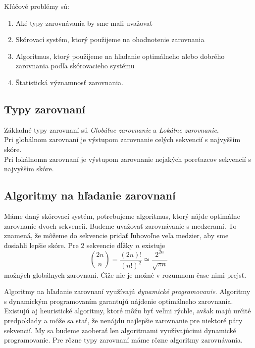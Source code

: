 Kľúčové problémy sú:
\begin{enumerate}
\item Aké typy zarovnávania by sme mali uvažovať
\item Skórovací systém, ktorý použijeme na ohodnotenie zarovnania
\item Algoritmus, ktorý použijeme na hľadanie optimálneho alebo dobrého zarovnania podľa skórovacieho systému
\item Štatistická významnosť zarovnania.
\end{enumerate}

\subsection{Typy zarovnaní}
Základné typy zarovnaní sú \textit{Globálne zarovnanie} a \textit{Lokálne zarovnanie}.\\ 
Pri globálnom zarovnaní je výstupom zarovnanie celých sekvencií s najvyšším skóre.\\
Pri lokálnomn zarovnaní je výstupom zarovnanie nejakých poreťazcov sekvencií s najvyšším skóre.


\subsection{Algoritmy na hľadanie zarovnaní}
Máme daný skórovací systém, potrebujeme algoritmus, ktorý nájde optimálne zarovnanie dvoch sekvencií.
Budeme uvažovať zarovnávanie s medzerami. To znamená, že môžeme do sekvencie pridať ľubovoľne veľa medzier, aby sme dosiahli lepšie skóre. Pre 2 sekvencie dĺžky $n$ existuje 
$$ {2n \choose n}  = \frac{(2n)!}{(n!)^2} \simeq \frac{2^{2n}}{\sqrt{\pi n}} $$
možných globálnych zarovnaní. Čiže nie je možné v rozumnom čase nimi prejsť.

Algoritmy na hľadanie zarovnaní využívajú \textit{dynamické programovanie}. Algoritmy s dynamickým programovaním garantujú nájdenie optimálneho zarovnania.
Existujú aj heuristické algoritmy, ktoré môžu byť veľmi rýchle, avšak majú určité predpoklady a môže sa stať, že nenájdu najlepšie zarovnanie pre niektoré páry sekvencií.
My sa budeme zaoberať len algoritmami využívajúcimi dynamické programovanie. Pre rôzne typy zarovnaní máme rôzne algoritmy zarovnávania.

